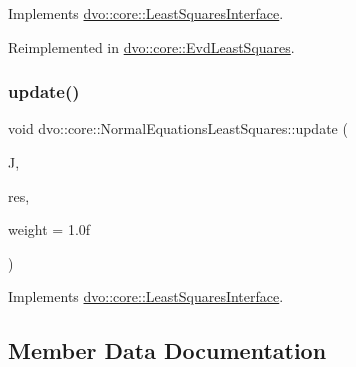 Implements \mbox{\hyperlink{classdvo_1_1core_1_1_least_squares_interface_a3e2b3c894c5286fdee79316e6fa4d691}{dvo\+::core\+::\+Least\+Squares\+Interface}}.



Reimplemented in \mbox{\hyperlink{classdvo_1_1core_1_1_evd_least_squares_a7264139b3006d803039707c4318d2451}{dvo\+::core\+::\+Evd\+Least\+Squares}}.

\mbox{\label{classdvo_1_1core_1_1_normal_equations_least_squares_a1ef767b22d889c99850b1b2dd8cd870d}} 
\subsubsection{\texorpdfstring{update()}{update()}}
{\footnotesize\ttfamily void dvo\+::core\+::\+Normal\+Equations\+Least\+Squares\+::update (\begin{DoxyParamCaption}\item[{const \mbox{\hyperlink{namespacedvo_1_1core_a05327f3312d32a301bce9fccda9e5807}{Vector6}} \&}]{J,  }\item[{const \mbox{\hyperlink{namespacedvo_1_1core_ab9c199d221775a923e2549ad7e15c323}{Num\+Type}} \&}]{res,  }\item[{const \mbox{\hyperlink{namespacedvo_1_1core_ab9c199d221775a923e2549ad7e15c323}{Num\+Type}} \&}]{weight = {\ttfamily 1.0f} }\end{DoxyParamCaption})\hspace{0.3cm}{\ttfamily [virtual]}}



Implements \mbox{\hyperlink{classdvo_1_1core_1_1_least_squares_interface_a5f5cc1c312a01ff4e7ca91e90a73ccf3}{dvo\+::core\+::\+Least\+Squares\+Interface}}.



\subsection{Member Data Documentation}
\mbox{\label{classdvo_1_1core_1_1_normal_equations_least_squares_af47004a3887290742e297bc32320e98b}} 

